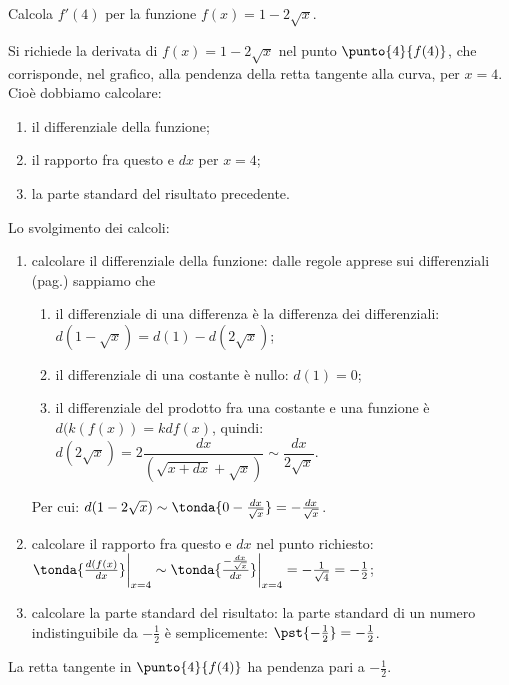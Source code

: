 \begin{esempio}
  Calcola $f'(4)$ per la funzione $f(x)=1-2\sqrt{x}$.
\begin{inaccessibleblock}
 \begin{center}
 \begin{minipage}[]{.40 \textwidth}
    \vspace{-5mm} 
  \derivaradice
 \end{minipage} 
 \hfill
 \begin{minipage}[]{.58 \textwidth}
   \vspace{5mm}
  Si richiede la derivata di $f(x)=1-2\sqrt{x}$ nel punto 
  $\punto{4}{f(4)}$, che corrisponde, nel grafico, alla pendenza della 
  retta tangente alla curva, per $x=4$. Cioè dobbiamo calcolare:
  \begin{enumerate} [noitemsep]
   \item il differenziale della funzione;
   \item il rapporto fra questo e $dx$ per $x=4$;
   \item la parte standard del risultato precedente.
  \end{enumerate}
\end{minipage}
\end{center}
\end{inaccessibleblock}
\label{}

Lo svolgimento dei calcoli:
\begin{enumerate} [noitemsep]
 \item calcolare il differenziale della funzione: dalle regole apprese 
  sui differenziali (pag.\pageref{subsubsec:diff01_diffradq}) sappiamo che
  \begin{enumerate} [noitemsep]
   \item il differenziale di una differenza è la differenza dei 
   differenziali:\\
    $d(1-\sqrt{x})=d(1)-d(2\sqrt{x})$;
   \item il differenziale di una costante è nullo: $d(1)=0$;
   \item il differenziale del prodotto fra una costante e una funzione è
   $d(k(f(x))=kdf(x)$, quindi: $d(2\sqrt{x})=
   2\dfrac{dx}{(\sqrt{x+dx}+\sqrt{x})}\sim \dfrac{dx}{2\sqrt{x}}$. 
  \end{enumerate} 
  Per cui: $d(1-2\sqrt{x})\sim\tonda{0-\frac{dx}{\sqrt{x}}}=
  -\frac{dx}{\sqrt{x}}$.
 \item calcolare il rapporto fra questo e $dx$ nel punto richiesto:\\
  $\tonda{\frac{d(f(x)}{dx}}\bigg|_{x=4}\sim
  \tonda{\frac{-\frac{dx}{\sqrt{x}}}{dx}}\bigg|_{x=4}=-\frac{1}{\sqrt{4}}=
  -\frac{1}{2}$;
 \item calcolare la parte standard del risultato: 
  la parte standard di un numero indistinguibile da $-\frac{1}{2}$ è
  semplicemente: $\pst{-\frac{1}{2}}=-\frac{1}{2}$.
\end{enumerate}
La retta tangente in $\punto{4}{f(4)}$ ha pendenza pari a $-\frac{1}{2}$.
\end{esempio}

